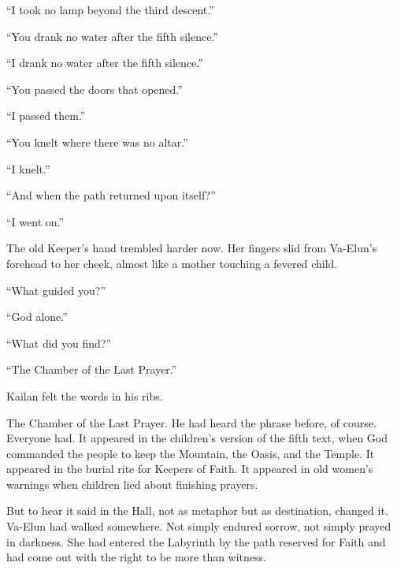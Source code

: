 “I took no lamp beyond the third descent.”\par

“You drank no water after the fifth silence.”\par

“I drank no water after the fifth silence.”\par

“You passed the doors that opened.”\par

“I passed them.”\par

“You knelt where there was no altar.”\par

“I knelt.”\par

“And when the path returned upon itself?”\par

“I went on.”\par

The old Keeper’s hand trembled harder now. Her fingers slid from Va-Elun’s forehead to her cheek, almost like a mother touching a fevered child.\par

“What guided you?”\par

“God alone.”\par

“What did you find?”\par

“The Chamber of the Last Prayer.”\par

Kailan felt the words in his ribs.\par

The Chamber of the Last Prayer. He had heard the phrase before, of course. Everyone had. It appeared in the children’s version of the fifth text, when God commanded the people to keep the Mountain, the Oasis, and the Temple. It appeared in the burial rite for Keepers of Faith. It appeared in old women’s warnings when children lied about finishing prayers.\par

But to hear it said in the Hall, not as metaphor but as destination, changed it. Va-Elun had walked somewhere. Not simply endured sorrow, not simply prayed in darkness. She had entered the Labyrinth by the path reserved for Faith and had come out with the right to be more than witness.\par

